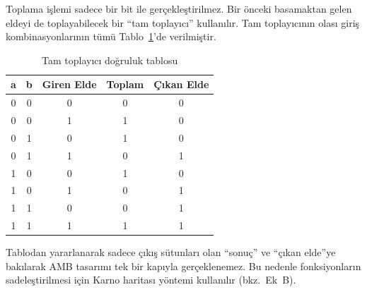Toplama işlemi sadece bir bit ile gerçekleştirilmez. Bir önceki basamaktan gelen eldeyi de toplayabilecek bir ``tam toplayıcı'' kullanılır. Tam toplayıcının olası giriş kombinasyonlarının tümü Tablo~\ref{tab:tam-toplayici}'de verilmiştir.

\begin{table}[htbp]
\centering
\caption{Tam toplayıcı doğruluk tablosu}
\label{tab:tam-toplayici}
\begin{tabular}{c c c | c c}
\toprule
\textbf{a} & \textbf{b} & \textbf{Giren Elde} & \textbf{Toplam} & \textbf{Çıkan Elde} \\
\midrule
0 & 0 & 0 & 0 & 0 \\
0 & 0 & 1 & 1 & 0 \\
0 & 1 & 0 & 1 & 0 \\
0 & 1 & 1 & 0 & 1 \\
1 & 0 & 0 & 1 & 0 \\
1 & 0 & 1 & 0 & 1 \\
1 & 1 & 0 & 0 & 1 \\
1 & 1 & 1 & 1 & 1 \\
\bottomrule
\end{tabular}
\end{table}

Tablodan yararlanarak sadece çıkış sütunları olan ``sonuç'' ve ``çıkan elde''ye bakılarak AMB tasarımı tek bir kapıyla gerçeklenemez. Bu nedenle fonksiyonların sadeleştirilmesi için Karno haritası yöntemi kullanılır (bkz.\ Ek~B).

